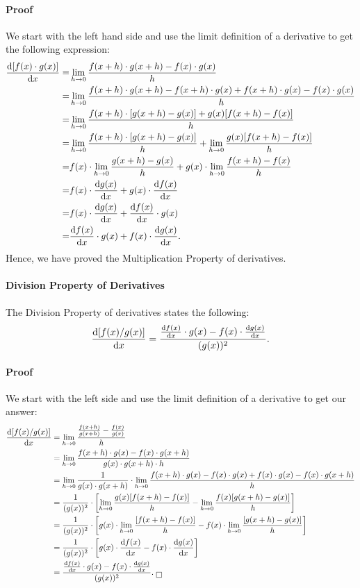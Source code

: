 \documentclass{article}
\begin{document}
\paragraph{Proof} We start with the left hand side and use the limit definition of a derivative to get the following expression:
\begin{align*}
    \diff{[f(x)\cdot g(x)]}{x} =&\lim_{h\to 0}\frac{f(x+h)\cdot g(x+h)-f(x)\cdot g(x)}{h}\\
    =&\lim_{h\to 0}\frac{f(x+h)\cdot g(x+h)-f(x+h)\cdot g(x)+f(x+h)\cdot g(x)-f(x)\cdot g(x)}{h}\\
    =&\lim_{h\to 0}\frac{f(x+h)\cdot [g(x+h)-g(x)]+g(x)[f(x+h)-f(x)]}{h}\\
    =&\lim_{h\to 0}\frac{f(x+h)\cdot [g(x+h)-g(x)]}{h}+\lim_{h\to 0}\frac{g(x)[f(x+h)-f(x)]}{h}\\
    =&f(x)\cdot \lim_{h\to 0}\frac{g(x+h)-g(x)}{h}+g(x)\cdot \lim_{h\to 0}\frac{f(x+h)-f(x)}{h}\\
    =&f(x)\cdot \diff{g(x)}{x}+g(x)\cdot \diff{f(x)}{x}\\
    =&f(x)\cdot \diff{g(x)}{x}+\diff{f(x)}{x}\cdot g(x)\\
    =&\diff{f(x)}{x}\cdot g(x) + f(x)\cdot \diff{g(x)}{x}.
\end{align*}
Hence, we have proved the Multiplication Property of derivatives. $\boxed{}$

\paragraph{Division Property of Derivatives} The Division Property of derivatives states the following:
\[\diff{[f(x) / g(x)]}{x}=\frac{\diff{f(x)}{x}\cdot g(x) - f(x)\cdot \diff{g(x)}{x}}{(g(x))^2}.\]

\paragraph{Proof} We start with the left side and use the limit definition of a derivative to get our answer: 
\begin{align*}
    \diff{[f(x) / g(x)]}{x} &= \lim_{h\to 0}\frac{\frac{f(x+h)}{g(x+h)}-\frac{f(x)}{g(x)}}{h}\\
    &= \lim_{h\to 0}\frac{f(x+h)\cdot g(x) - f(x)\cdot g(x+h)}{g(x)\cdot g(x+h)\cdot h}\\
    &= \lim_{h\to 0}\frac{1}{g(x)\cdot g(x+h)}\cdot \lim_{h\to 0}\frac{f(x+h)\cdot g(x) - f(x)\cdot g(x) + f(x)\cdot g(x) - f(x)\cdot g(x+h)}{h}\\
    &= \frac{1}{(g(x))^2}\cdot \left[\lim_{h\to 0}\frac{g(x) [f(x+h) - f(x)]}{h} - \lim_{h\to 0}\frac{f(x)[g(x+h) - g(x)]}{h}\right]\\
    &= \frac{1}{(g(x))^2}\cdot \left[g(x)\cdot \lim_{h\to 0}\frac{[f(x+h) - f(x)]}{h} - f(x)\cdot \lim_{h\to 0}\frac{[g(x+h) - g(x)]}{h}\right]\\
    &= \frac{1}{(g(x))^2}\cdot \left[g(x)\cdot \diff{f(x)}{x} - f(x)\cdot \diff{g(x)}{x}\right]\\
    &= \frac{\diff{f(x)}{x}\cdot g(x) - f(x)\cdot \diff{g(x)}{x}}{(g(x))^2}.\text{ }\boxed{}\\
\end{align*}
\end{document}

